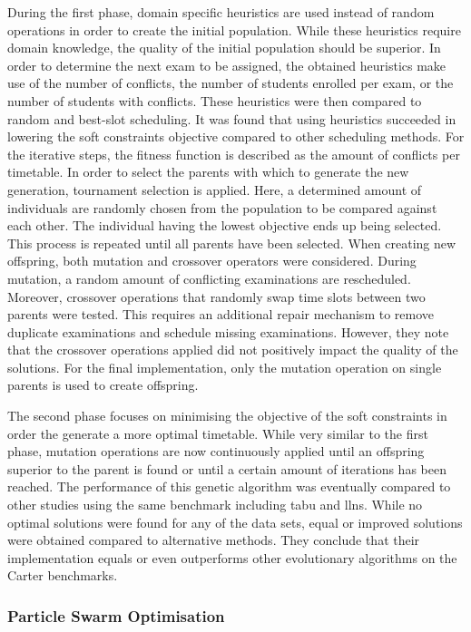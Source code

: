 During the first phase, domain specific heuristics are used instead of random operations in order to create the initial population. While these heuristics require domain knowledge, the quality of the initial population should be superior. In order to determine the next exam to be assigned, the obtained heuristics make use of the number of conflicts, the number of students enrolled per exam, or the number of students with conflicts. These heuristics were then compared to random and best-slot scheduling. It was found that using heuristics succeeded in lowering the soft constraints objective compared to other scheduling methods. For the iterative steps, the fitness function is described as the amount of conflicts per timetable. In order to select the parents with which to generate the new generation, tournament selection is applied. Here, a determined amount of individuals are randomly chosen from the population to be compared against each other. The individual having the lowest objective ends up being selected. This process is repeated until all parents have been selected. When creating new offspring, both mutation and crossover operators were considered. During mutation, a random amount of conflicting examinations are rescheduled. Moreover, crossover operations that randomly swap time slots between two parents were tested. This requires an additional repair mechanism to remove duplicate examinations and schedule missing examinations. However, they note that the crossover operations applied did not positively impact the quality of the solutions. For the final implementation, only the mutation operation on single parents is used to create offspring.

The second phase focuses on minimising the objective of the soft constraints in order the generate a more optimal timetable. While very similar to the first phase,  mutation operations are now continuously applied until an offspring superior to the parent is found or until a certain amount of iterations has been reached. The performance of this genetic algorithm was eventually compared to other studies using the same benchmark including \acrlong{tabu} and l\acrlong{lns}. While no optimal solutions were found for any of the data sets, equal or improved solutions were obtained compared to alternative methods. They conclude that their implementation equals or even outperforms other evolutionary algorithms on the Carter benchmarks.

\subsubsection{Particle Swarm Optimisation}

